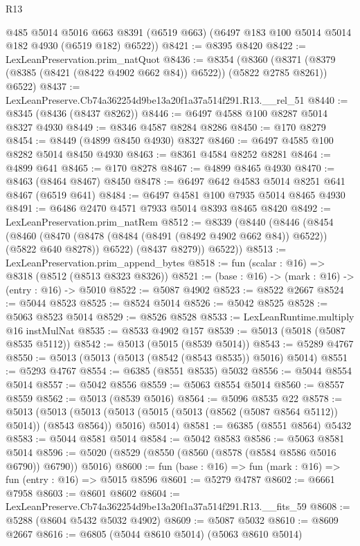 \begin{lexlean}{R13}
\begin{coremodule}
      @485
      @5014
      @5016
      @663
      @8391
      (@6519 @663)
      (@6497 @183 @100 @5014 @5014 @182 @4930 (@6519 @182) @6522))
@8421 := @8395 @8420
@8422 := LexLeanPreservation.prim_natQuot
@8436 := @8354
    (@8360 (@8371 (@8379 (@8385 (@8421 (@8422 @4902 @662 @84)) @6522)) (@5822 @2785 @8261)) @6522)
@8437 := LexLeanPreserve.Cb74a362254d9be13a20f1a37a514f291.R13.__rel_51
@8440 := @8345 (@8436 (@8437 @8262))
@8446 := @6497 @4588 @100 @8287 @5014 @8327 @4930
@8449 := @8346 @4587 @8284 @8286
@8450 := @170 @8279
@8454 := @8449 (@4899 @8450 @4930) @8327
@8460 := @6497 @4585 @100 @8282 @5014 @8450 @4930
@8463 := @8361 @4584 @8252 @8281
@8464 := @4899 @641
@8465 := @170 @8278
@8467 := @4899 @8465 @4930
@8470 := @8463 (@8464 @8467) @8450
@8478 := @6497 @642 @4583 @5014 @8251 @641 @8467 (@6519 @641)
@8484 := @6497 @4581 @100 @7935 @5014 @8465 @4930
@8491 := @6486 @2470 @4571 @7933 @5014 @8393 @8465 @8420
@8492 := LexLeanPreservation.prim_natRem
@8512 := @8339
    (@8440
      (@8446
        (@8454
          (@8460
            (@8470 (@8478 (@8484 (@8491 (@8492 @4902 @662 @84)) @6522)) (@5822 @640 @8278))
            @6522)
          (@8437 @8279))
        @6522))
@8513 := LexLeanPreservation.prim_append_bytes
@8518 := fun (scalar : @16) => @8318 (@8512 (@8513 @8323 @8326))
@8521 := (base : @16) -> (mark : @16) -> (entry : @16) -> @5010
@8522 := @5087 @4902
@8523 := @8522 @2667
@8524 := @5044 @8523
@8525 := @8524 @5014
@8526 := @5042 @8525
@8528 := @5063 @8523 @5014
@8529 := @8526 @8528
@8533 := LexLeanRuntime.multiply @16 instMulNat
@8535 := @8533 @4902 @157
@8539 := @5013 (@5018 (@5087 @8535 @5112))
@8542 := @5013 (@5015 (@8539 @5014))
@8543 := @5289 @4767
@8550 := @5013 (@5013 (@5013 (@8542 (@8543 @8535)) @5016) @5014)
@8551 := @5293 @4767
@8554 := @6385 (@8551 @8535) @5032
@8556 := @5044 @8554 @5014
@8557 := @5042 @8556
@8559 := @5063 @8554 @5014
@8560 := @8557 @8559
@8562 := @5013 (@8539 @5016)
@8564 := @5096 @8535 @22
@8578 := @5013
    (@5013
      (@5013 (@5013 (@5015 (@5013 (@8562 (@5087 @8564 @5112)) @5014)) (@8543 @8564)) @5016)
      @5014)
@8581 := @6385 (@8551 @8564) @5432
@8583 := @5044 @8581 @5014
@8584 := @5042 @8583
@8586 := @5063 @8581 @5014
@8596 := @5020 (@8529 (@8550 (@8560 (@8578 (@8584 @8586 @5016 @6790)) @6790)) @5016)
@8600 := fun (base : @16) => fun (mark : @16) => fun (entry : @16) => @5015 @8596
@8601 := @5279 @4787
@8602 := @6661 @7958
@8603 := @8601 @8602
@8604 := LexLeanPreserve.Cb74a362254d9be13a20f1a37a514f291.R13.__fits_59
@8608 := @5288 (@8604 @5432 @5032 @4902)
@8609 := @5087 @5032
@8610 := @8609 @2667
@8616 := @6805 (@5044 @8610 @5014) (@5063 @8610 @5014)

\end{coremodule}
\end{lexlean}
